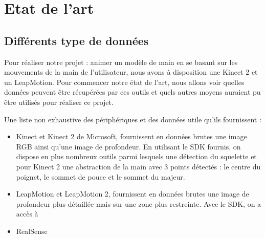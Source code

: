 \documentclass{article}
\begin{document}
\newpage



\tableofcontents

\newpage












\newpage




\section{Etat de l'art}

\subsection{Différents type de données}
Pour réaliser notre projet : animer un modèle de main en se basant sur les mouvements de la main de l'utilisateur, nous avons à disposition une Kinect 2 et un LeapMotion. Pour commencer notre état de l'art, nous allons voir quelles données peuvent être récupérées par ces outils et quels autres moyens auraient pu être utilisés pour réaliser ce projet.

Une liste non exhaustive des périphériques et des données utile qu'ils fournissent : 
\begin{itemize}
\item Kinect et Kinect 2 de Microsoft, fournissent en données brutes une image RGB ainsi qu'une image de profondeur. En utilisant le SDK fournis, on dispose en plus nombreux outils parmi lesquels une détection du squelette et pour Kinect 2 une abstraction de la main avec 3 points détectés : le centre du poignet, le sommet de pouce et le sommet du majeur. 
\item LeapMotion et LeapMotion 2, fournissent en données brutes une image de profondeur plus détaillée mais sur une zone plus restreinte. Avec le SDK, on a accès à 
\item RealSense 
\end{itemize}
\end{document}

